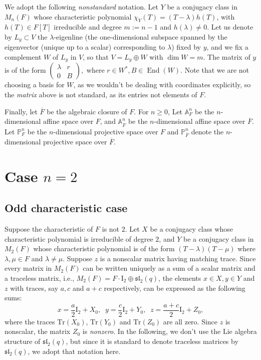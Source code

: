 \documentclass[preprint,11pt]{amsart}
\def\A{\mathbb{A}}
\def\P{\mathbb{P}}
\theoremstyle{definition}
\numberwithin{thm}{section}
\newcommand{\End}{\operatorname{End}}
\def\sl{\mathfrak{sl}}
\newcommand{\tit}[1]{\textit{#1}}
\newcommand{\lam}{\lambda}
\newcommand{\tr}{\textrm{Tr}}
\newcommand{\sub}{\subset}
\newcommand{\ol}[1]{\overline{#1}}
\begin{document}
We adopt the following \tit{nonstandard} notation. Let $Y$ be a conjugacy class  in $M_n(F)$ whose characteristic polynomial $\chi_Y(T) = (T- \lam) h(T)$, with $h(T) \in F[T]$ irreducible and degree $m := n-1$ and $h(\lam) \neq 0$. Let us denote by $L_y \sub V$ the $\lam$-eigenline (the one-dimensional subspace spanned by the  eigenvector (unique up to a scalar) corresponding to $\lambda$) fixed by $y$, and we fix  a complement $W$ of $L_y$ in $V$, so that $V = L_y \oplus W$ with $\dim W = m$. The matrix of $y$ is of the form 
$
\begin{pmatrix} \lam & r  \\ 0 & B \end{pmatrix},
$
where $r \in W^*, B \in \End(W)$. Note that we are not choosing a basis for $W$, as we wouldn't be dealing with coordinates explicitly, so the \tit{matrix} above is not standard, as its entries not elements of $F$.


Finally, let $\ol{F}$ be the algebraic closure of $F$. For $n \geq 0$, Let $\A_{F}^n$ be the $n$-dimensional affine space over $F$, and $\A_{\ol{F}}^n$ be the $n$-dimensional affine space over $\ol{F}$. Let $\P^n_F$ be the $n$-dimensional projective space over $F$ and $\P^n_{\ol{F}}$ denote the $n$-dimensional projective space over $\ol{F}$.
\section{Case $n=2$}



\subsection{Odd characteristic case}

Suppose the characteristic of $F$ is not $2$. 
Let $X$ be a conjugacy class whose characteristic polynomial is irreducible of degree $2$, and $Y$ be a conjugacy class in $M_2(F)$ whose characteristic polynomial is of the form $(T- \lam)(T - \mu)$ where $\lam, \mu \in F$ and $\lam \neq \mu$. Suppose $z$ is a nonscalar matrix having matching trace. Since every matrix in $M_2(F)$ can be written uniquely as a sum of a scalar matrix and a traceless matrix, i.e., $M_2(F) = F \cdot \mathrm{I}_2 \oplus \sl_2(q)$, the elements $x \in X, y \in Y$ and $z$ with traces, say $a,c$ and $a+c$ respectively, can be expressed as the following sums:
$$
x = \frac{a}{2} \mathrm{I}_2 + X_0, \; \;  y = \frac{c}{2} \mathrm{I}_2 + Y_0, \; \;  z = \frac{a+c}{2} \mathrm{I}_2+ Z_0,
$$
where the traces $\tr(X_0)$, $\tr(Y_0)$ and $\tr(Z_0)$ are all zero. Since $z$ is nonscalar, the matrix $Z_0$ is \tit{nonzero}. In the following, we don't use the Lie algebra structure of $\sl_2(q)$, but since it is standard to denote traceless matrices by $\sl_2(q)$, we adopt that notation here.
\end{document}

